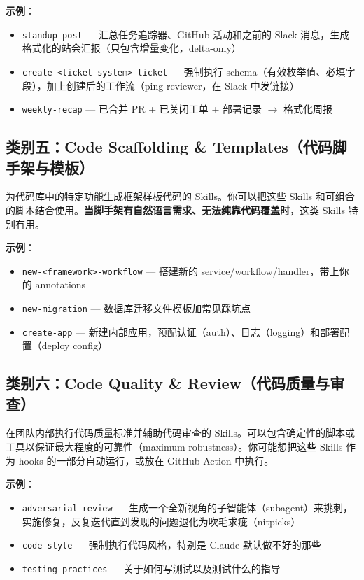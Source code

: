 \textbf{示例}：
\begin{itemize}
    \item \texttt{standup-post} --- 汇总任务追踪器、GitHub 活动和之前的 Slack 消息，生成格式化的站会汇报（只包含增量变化，delta-only）
    \item \texttt{create-<ticket-system>-ticket} --- 强制执行 schema（有效枚举值、必填字段），加上创建后的工作流（ping reviewer，在 Slack 中发链接）
    \item \texttt{weekly-recap} --- 已合并 PR + 已关闭工单 + 部署记录 $\to$ 格式化周报
\end{itemize}

\subsection{类别五：Code Scaffolding \& Templates（代码脚手架与模板）}

为代码库中的特定功能生成框架样板代码的 Skills。你可以把这些 Skills 和可组合的脚本结合使用。\textbf{当脚手架有自然语言需求、无法纯靠代码覆盖时}，这类 Skills 特别有用。

\textbf{示例}：
\begin{itemize}
    \item \texttt{new-<framework>-workflow} --- 搭建新的 service/workflow/handler，带上你的 annotations
    \item \texttt{new-migration} --- 数据库迁移文件模板加常见踩坑点
    \item \texttt{create-app} --- 新建内部应用，预配认证（auth）、日志（logging）和部署配置（deploy config）
\end{itemize}

\subsection{类别六：Code Quality \& Review（代码质量与审查）}

在团队内部执行代码质量标准并辅助代码审查的 Skills。可以包含确定性的脚本或工具以保证最大程度的可靠性（maximum robustness）。你可能想把这些 Skills 作为 hooks 的一部分自动运行，或放在 GitHub Action 中执行。

\textbf{示例}：
\begin{itemize}
    \item \texttt{adversarial-review} --- 生成一个全新视角的子智能体（subagent）来挑刺，实施修复，反复迭代直到发现的问题退化为吹毛求疵（nitpicks）
    \item \texttt{code-style} --- 强制执行代码风格，特别是 Claude 默认做不好的那些
    \item \texttt{testing-practices} --- 关于如何写测试以及测试什么的指导
\end{itemize}

